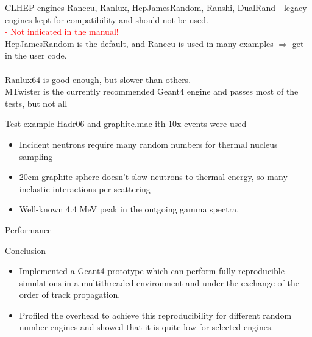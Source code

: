 \documentclass[aspectratio=169, 14pt]{beamer}
\begin{document}
\begin{large}
 \begin{frame}{CLHEP engines}
    Ranecu, Ranlux, HepJamesRandom, Ranshi, DualRand - legacy engines kept for compatibility and should not be used.
    \\ \textcolor{red}{ - Not indicated in the manual!}\\
    HepJamesRandom is the default, and Ranecu is used in many examples $\Rightarrow$ get in the user code.\\ \ \\
    Ranlux64 is good enough, but slower than others.\\
    MTwister is the currently recommended Geant4 engine and passes most of the tests, but not all
 \end{frame}
 
 \begin{frame}{Test example}
  Hadr06 and graphite.mac ith 10x events were used
  \begin{itemize}
   \item Incident neutrons require many random numbers for thermal nucleus sampling
   \item 20cm graphite sphere doesn't slow neutrons to thermal energy, so many inelastic interactions per scattering
   \item Well-known 4.4 MeV peak in the outgoing gamma spectra.
  \end{itemize}
 \end{frame}

 
 \begin{frame}{Performance}
  \begin{figure}
   \begin{subfloat}[][]
    \centering
    \scalebox{.33}{}  
   \end{subfloat}
   \begin{subfloat}[][]
    \centering
    \scalebox{.33}{}  
    \label{fig:B}
   \end{subfloat}
  \end{figure}
 \end{frame}

 
 \begin{frame}{Conclusion}
  \begin{itemize}
   \item Implemented a Geant4 prototype which can perform fully reproducible simulations in a multithreaded environment and under the exchange of the order of track propagation.
   \item Profiled the overhead to achieve this reproducibility for different random number engines and showed that it is quite low for selected engines.
  

\end{itemize}
\end{frame}
\end{large}
\end{document}
